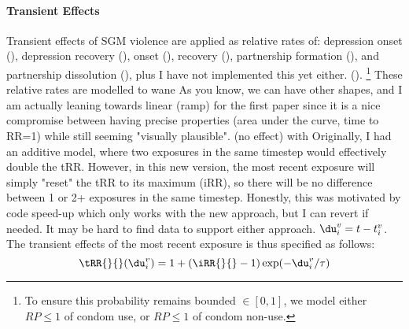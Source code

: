 \paragraph{Transient Effects}
Transient effects of SGM violence are applied as relative rates of:
depression onset (),
depression recovery (),
\hazdrink onset (),
\hazdrink recovery (),
partnership formation (), and
partnership dissolution (), plus
     {I have not implemented this yet either.}
().%
\footnote{To ensure this probability remains bounded $\in [0,1]$,
  we model either $RP \le 1$ of condom use, or $RP \le 1$ of condom non-use.}
These relative rates are modelled to wane
     {As you know, we can have other shapes,
      and I am actually leaning towards linear (ramp)
      for the first paper since it is a nice compromise between
      having precise properties (area under the curve, time to RR=1)
      while still seeming "visually plausible".}
(\ie no effect) with
     {Originally, I had an additive model,
      where two exposures in the same timestep would effectively double the tRR.
      However, in this new version, the most recent exposure
      will simply "reset" the tRR to its maximum (iRR),
      so there will be no difference between 1 or 2+ exposures in the same timestep.
      Honestly, this was motivated by code speed-up
      which only works with the new approach, but I can revert if needed.
      It may be hard to find data to support either approach.}
$\du^v_i = t - t^v_i$.
The transient effects of the most recent exposure is thus specified as follows:
\begin{equation}\label{eq:tRR}
  \tRR{}{}(\du^v_i) = 1+(\iRR{}{}-1)\exp(-\du^v_i/\tau)
\end{equation}
